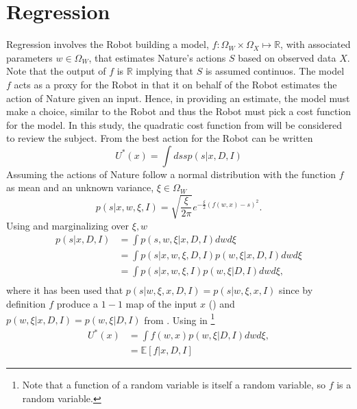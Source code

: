 \chapter{Regression}
\label{chp:regression}
Regression involves the Robot building a model, $f: \Omega_W\times \Omega_X\mapsto\mathbb{R}$, with associated parameters $w\in \Omega_W$, that estimates Nature's actions $S$ based on observed data $X$. Note that the output of $f$ is $\mathbb{R}$ implying that $S$ is assumed continuos. The model $f$ acts as a proxy for the Robot in that it on behalf of the Robot estimates the action of Nature given an input. Hence, in providing an estimate, the model must make a choice, similar to the Robot and thus the Robot must pick a cost function for the model. In this study, the quadratic cost function from  will be considered to review the subject. From  the best action for the Robot can be written
\begin{equation}
	U^*(x) = \int ds s p(s|x,D,I)
	\label{eq:q1}
\end{equation}
Assuming the actions of Nature follow a normal distribution with the function $f$ as mean and an unknown variance, $\xi\in \Omega_W$
\begin{equation}
	p(s|x,w,\xi,I)=\sqrt{\frac{\xi}{2\pi}} e^{-\frac{\xi}{2}(f(w,x)-s)^2}.
	\label{f_dist}
\end{equation}
Using  and marginalizing over $\xi,w$
\begin{equation}
	\begin{split}
		p(s|x,D,I) &= \int p(s,w,\xi|x,D,I) dw d\xi\\
		& = \int p(s|x,w,\xi,D,I)  p(w,\xi|x,D,I)dw d\xi\\
		& = \int p(s|x,w,\xi,I)  p(w,\xi|D,I)dw d\xi,\\
	\end{split}
	\label{eq:q2}
\end{equation}
where it has been used that $p(s|w,\xi,x,D,I) = p(s|w,\xi,x,I)$ since by definition $f$ produce a $1-1$ map of the input $x$ () and $p(w,\xi|x,D,I) = p(w,\xi|D,I)$ from . Using  in \footnote{Note that a function of a random variable is itself a random variable, so $f$ is a random variable.}
\begin{equation}
	\begin{split}
		U^*(x) & = \int f(w,x)  p(w,\xi|D,I) dw d\xi,\\
		& = \mathbb{E}[f|x,D,I]
	\end{split}
	\label{eq:q3}
\end{equation}	
